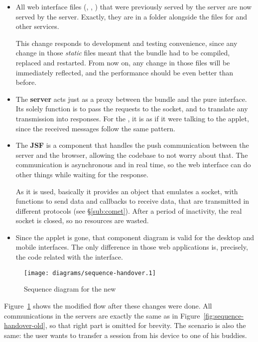\begin{itemize}
  \item All web interface files (, , ) that were previously served by the  server are now served by the  server.
  Exactly, they are in a folder alongside the  files for  and other services.
  
  This change responds to development and testing convenience, since any change in those \emph{static} files meant that the  bundle had to be compiled, replaced and restarted.
  From now on, any change in those files will be immediately reflected, and the performance should be even better than before.
  \item The \textbf{ server} acts just as a proxy between the  bundle and the pure  interface.
  Its solely function is to pass the  requests to the  socket, and to translate any  transmission into  responses.
  For the , it is as if it were talking to the  applet, since the received messages follow the same pattern.
  \item The \textbf{ JSF} is a  component that handles the push communication between the server and the browser, allowing the  codebase to not worry about that.
  The communication is asynchronous and in real time, so the web interface can do other things while waiting for the response.
  
  As it is used, basically it provides an object that emulates a  socket, with functions to send data and callbacks to receive data, that are transmitted in different  protocols (see \S\ref{sub:comet}).
  After a period of inactivity, the real socket is closed, so no resources are wasted.
  \item Since the  applet is gone, that component diagram is valid for the desktop and mobile interfaces.
  The only difference in those web applications is, precisely, the code related with the interface.
\end{itemize}

\begin{figure}[htbp]
  \centering
    \texttt{[image: diagrams/sequence-handover.1]}
  \caption{Sequence diagram for the new }
  \label{fig:sequence-handover}
\end{figure}

Figure~\ref{fig:sequence-handover} shows the modified flow after these changes were done.
All communications in the servers are exactly the same as in Figure~\ref{fig:sequence-handover-old}, so that right part is omitted for brevity.
The scenario is also the same: the user wants to transfer a session from his device to one of his buddies.

